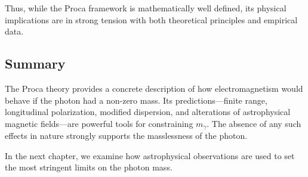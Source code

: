 Thus, while the Proca framework is mathematically well defined, its 
physical implications are in strong tension with both theoretical 
principles and empirical data.

\subsection*{Summary}

The Proca theory provides a concrete description of how electromagnetism 
would behave if the photon had a non-zero mass. Its predictions—finite 
range, longitudinal polarization, modified dispersion, and alterations of 
astrophysical magnetic fields—are powerful tools for constraining 
$m_\gamma$. The absence of any such effects in nature strongly supports 
the masslessness of the photon.

In the next chapter, we examine how astrophysical observations are used to 
set the most stringent limits on the photon mass.
